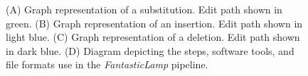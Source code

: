 \documentclass{bioinfo}
\theoremstyle{definition}
\begin{document}
\begin{figure}[htbp]
\begin{minipage}[b]{0.35\columnwidth}
		\label{fig:panel}
	\end{minipage}
	\hfill
	\begin{minipage}[b]{0.64\columnwidth}
		\centering
		\label{fig:flow}
	\end{minipage}
	\caption{(A) Graph representation of a substitution. Edit path shown in green. (B) Graph representation of an insertion. Edit path shown in light blue. (C) Graph representation of a deletion. Edit path shown in dark blue. (D) Diagram depicting the steps, software tools, and file formats use in the \textit{FantasticLamp} pipeline.}
	\label{fig:images}
\end{figure}
\end{document}
